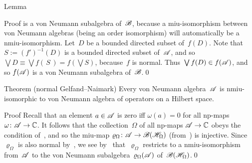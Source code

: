 \documentclass[a]{subfiles}
\begin{document}
\begin{parsec}
\begin{point}{Lemma}
\begin{point}{Proof}
is a von Neumann subalgebra of~$\mathscr{B}$,
because a miu-isomorphism between von Neumann algebras
(being an order isomorphism)
will automatically be a nmiu-isomorphism.
Let~$D$ be a bounded directed subset of~$f(D)$.
Note that~$S:=(f')^{-1}(D)$ is a bounded
directed subset of~$\mathscr{A}$,
and so~$\bigvee D\equiv  \bigvee f(\,S\,)
= f(\bigvee S)$, because~$f$ is normal.
Thus~$\bigvee f(D)\in f(\mathscr{A})$,
and so $f(\mathscr{A})$ is a von Neumann subalgebra of~$\mathscr{B}$.\qed
\end{point}
\end{point}
\begin{point}[ngns]{Theorem (normal Gelfand--Naimark)}%
Every von Neumann algebra~$\mathscr{A}$ is nmiu-isomorphic
to von Neumann algebra of operators on a Hilbert space.
\begin{point}{Proof}%
Recall that an element $a\in \mathscr{A}$ is zero iff $\omega(a)=0$
for all np-maps $\omega\colon \mathscr{A}\to\mathbb{C}$.
It follows that the collection~$\Omega$
of all np-maps $\mathscr{A}\to\mathbb{C}$
obeys the condition of~,
and so the miu-map $\varrho_\Omega\colon \mathscr{A}\to\mathscr{B}(\mathscr{H}_\Omega)$
(from~)
is injective.
Since~$\varrho_\Omega$
is also normal by~,
we see by~ that~$\varrho_\Omega$
restricts to a nmiu-isomorphism
from~$\mathscr{A}$ to the von Neumann subalgebra~$\varrho_\Omega(\mathscr{A})$
of~$\mathscr{B}(\mathscr{H}_\Omega)$.\qed
\end{point}
\end{point}
\end{parsec}
\end{document}
